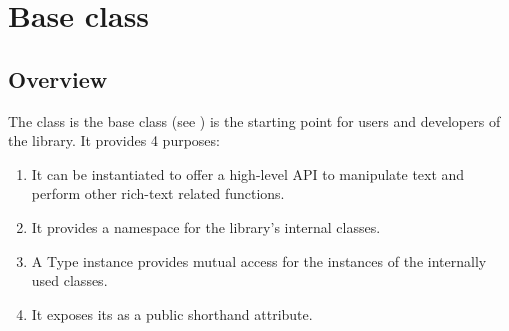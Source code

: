 








\section{Base class}
\label{sec:core}

\subsection{Overview}

The  class is the base class (see ) is the starting point for users and developers of the library. It provides 4 purposes:

\begin{enumerate}
\item It can be instantiated to offer a high-level API to manipulate text and perform other rich-text related functions.
\item It provides a namespace for the library's internal classes.
\item A Type instance provides mutual access for the instances of the internally used classes.
\item It exposes its  as a public shorthand attribute.
\end{enumerate}

